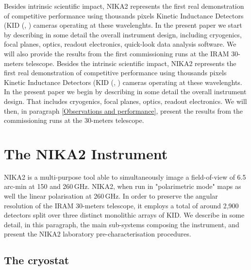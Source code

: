 \documentclass[]{aa} %
\begin{document}
Besides intrinsic scientific impact, NIKA2 represents the first real demonstration of competitive performance using thousands pixels Kinetic Inductance Detectors (KID (\cite{Day2003}, \cite{Doyle2010}) cameras operating at these wavelenghts. In the present paper we start by describing in some detail the overall instrument design, including cryogenics, focal planes, optics, readout electronics, quick-look data analysis software. We will also provide the results from the first commissioning runs at the IRAM 30-meters telescope. 
Besides the intrinsic scientific impact, NIKA2 represents the first real demonstration of competitive performance using thousands pixels Kinetic Inductance Detectors (KID (\cite{Day2003}, \cite{Doyle2010}) cameras operating at these wavelenghts. In the present paper we begin by describing in some detail the overall instrument design. That includes cryogenics, focal planes, optics, readout electronics. We will then, in paragraph \ref{Observations and performance}, present the results from the commissioning runs at the 30-meters telescope. 


\section{The NIKA2 Instrument}

NIKA2 is a multi-purpose tool able to simultaneously image a field-of-view of 6.5\,arc-min at 150 and 260\,GHz. NIKA2, when run in "polarimetric mode"  maps as well the linear polarisation  at 260\,GHz. In order to preserve the angular resolution of the IRAM 30-meters telescope, it employs a total of around 2,900\,detectors split over three distinct monolithic arrays of KID. We describe in some detail, in this paragraph, the main sub-systems composing the instrument, and present the NIKA2 laboratory pre-characterisation procedures.

 \subsection{The cryostat}
\end{document}
